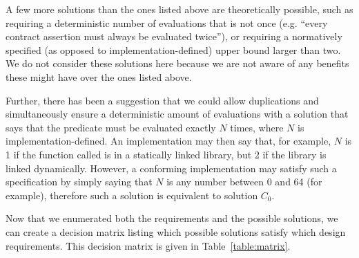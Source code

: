A few more solutions than the ones listed above are theoretically possible, such as requiring a deterministic number of evaluations that is not once (e.g. ``every contract assertion must always be evaluated twice''), or requiring a normatively specified (as opposed to implementation-defined) upper bound larger than two. We do not consider these solutions here because we are not aware of any benefits these might have over the ones listed above. 

Further, there has been a suggestion that we could allow duplications and simultaneously ensure a deterministic amount of evaluations with a solution that says that the predicate must be evaluated exactly $N$ times, where $N$ is implementation-defined. An implementation may then say that, for example, $N$ is 1 if the function called is in a statically linked library, but 2 if the library is linked dynamically. However, a conforming implementation may satisfy such a specification by simply saying that $N$ is any number between 0 and 64 (for example), therefore such a solution is equivalent to solution $C_0$.

Now that we enumerated both the requirements and the possible solutions, we can create a decision matrix listing which possible solutions satisfy which design requirements. This decision matrix is given in Table~\ref{table:matrix}.


